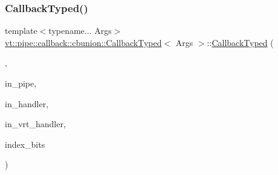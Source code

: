 \subsubsection{\texorpdfstring{Callback\+Typed()}{CallbackTyped()}\hspace{0.1cm}{\footnotesize\ttfamily [10/12]}}
{\footnotesize\ttfamily template$<$typename... Args$>$ \\
\hyperlink{structvt_1_1pipe_1_1callback_1_1cbunion_1_1_callback_typed}{vt\+::pipe\+::callback\+::cbunion\+::\+Callback\+Typed}$<$ Args $>$\+::\hyperlink{structvt_1_1pipe_1_1callback_1_1cbunion_1_1_callback_typed}{Callback\+Typed} (\begin{DoxyParamCaption}\item[{Raw\+Send\+Col\+Dir\+Tag\+Type}]{,  }\item[{\hyperlink{namespacevt_ac9852acda74d1896f48f406cd72c7bd3}{Pipe\+Type} const \&}]{in\+\_\+pipe,  }\item[{\hyperlink{namespacevt_af64846b57dfcaf104da3ef6967917573}{Handler\+Type} const}]{in\+\_\+handler,  }\item[{\hyperlink{structvt_1_1pipe_1_1callback_1_1cbunion_1_1_callback_raw_base_single_a734a9c83099de5bc1cd85f9da8dba7bb}{Auto\+Handler\+Type} const}]{in\+\_\+vrt\+\_\+handler,  }\item[{std\+::byte $\ast$}]{index\+\_\+bits }\end{DoxyParamCaption})\hspace{0.3cm}{\ttfamily [inline]}}

\mbox{\label{structvt_1_1pipe_1_1callback_1_1cbunion_1_1_callback_typed_a5ac854c689dea58e9063903a460d8f9d}} 
